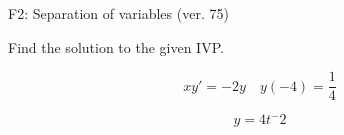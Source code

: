 \begin{exercise}
  \begin{exerciseTitle}F2: Separation of variables (ver. 75)\end{exerciseTitle}
  \begin{exerciseStatement}
    
Find the solution to the given IVP.

    
\[xy'= -2 y \hspace{1em} y( -4 ) = \frac{1}{4}\]

  \end{exerciseStatement}
  \begin{exerciseAnswer}
    
\[y= 4 t^ -2\]

  \end{exerciseAnswer}
\end{exercise}